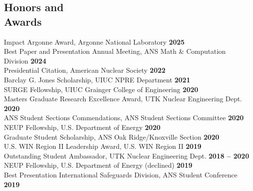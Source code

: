 \documentclass[margin,line]{resume}
\begin{document}
\begin{resume}
    \section{\mysidestyle Honors and\\Awards}
        Impact Argonne Award, Argonne National Laboratory \hfill \textbf{2025}\vspace{0.5mm}\\
        Best Paper and Presentation Annual Meeting, ANS Math \& Computation Division \hfill \textbf{2024}\vspace{0.5mm}\\
        Presidential Citation, American Nuclear Society \hfill \textbf{2022}\vspace{.5mm}\\
        Barclay G. Jones Scholarship, UIUC NPRE Department \hfill \textbf{2021}\vspace{0.5mm}\\
        SURGE Fellowship, UIUC Grainger College of Engineering \hfill \textbf{2020}\vspace{0.5mm}\\
        Masters Graduate Research Excellence Award, UTK Nuclear Engineering Dept. \hfill \textbf{2020}\vspace{.5mm}\\%
        ANS Student Sections Commendations, ANS Student Sections Committee \hfill \textbf{2020}\vspace{.5mm}\\%
        NEUP Fellowship, U.S. Department of Energy \hfill \textbf{2020}\vspace{0.5mm}\\
        Graduate Student Scholarship, ANS Oak Ridge/Knoxville Section \hfill \textbf{2020}\vspace{0.5mm}\\
        U.S. WIN Region II Leadership Award, U.S. WIN Region II \hfill \textbf{2019}\vspace{.5mm}\\%
        Outstanding Student Ambassador, UTK Nuclear Engineering Dept. \hfill \textbf{2018 -- 2020}\vspace{.5mm}\\%
        NEUP Fellowship, U.S. Department of Energy (declined) \hfill \textbf{2019}\vspace{0.5mm}\\
        Best Presentation International Safeguards Division, ANS Student Conference \hfill \textbf{2019}\vspace{0.5mm}\\%

\end{resume}
\end{document}
